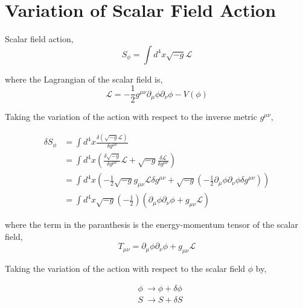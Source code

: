 \section{Variation of Scalar Field Action \label{sec:variation_of_sf_action}}

Scalar field action,
\begin{equation}
S_{\phi} = \int d^{4}x\sqrt{-g}\mathcal{L}
\end{equation}

where the Lagrangian of the scalar field is,
\begin{equation}
\mathcal{L} = -\frac{1}{2}g^{\mu\nu}\partial_{\mu}\phi\partial_{\nu}\phi - V\left(\phi\right)
\end{equation}

Taking the variation of the action with respect to the inverse metric $g^{\mu\nu}$,

\begin{equation}
\begin{split}
\delta S_{\phi} &= \int d^{4}x\frac{\delta\left(\sqrt{-g}\mathcal{L}\right)}{\delta g^{\mu\nu}}\\
&= \int d^{4}x\left(\frac{\delta\sqrt{-g}}{\delta g^{\mu\nu}}\mathcal{L} + \sqrt{-g}\frac{\delta\mathcal{L}}{\delta g^{\mu\nu}}\right)\\
&= \int d^{4}x\left(-\frac{1}{2}\sqrt{-g}g_{\mu\nu}\mathcal{L}\delta g^{\mu\nu} + \sqrt{-g}\left(-\frac{1}{2}\partial_{\mu}\phi\partial_{\nu}\phi\delta g^{\mu\nu}\right)\right)\\
&= \int d^{4}x\sqrt{-g}\left(-\frac{1}{2}\right)\left(\partial_{\mu}\phi\partial_{\nu}\phi + g_{\mu\nu}\mathcal{L}\right)
\end{split}
\end{equation}

where the term in the paranthesis is the energy-momentum tensor of the scalar field,
\begin{equation}
T_{\mu\nu} = \partial_{\mu}\phi\partial_{\nu}\phi + g_{\mu\nu}\mathcal{L}
\end{equation}


Taking the variation of the action with respect to the scalar field $\phi$ by,

\begin{equation}
\begin{split}
&\phi\ \rightarrow \phi + \delta\phi\\
&S\ \rightarrow S + \delta S
\end{split}
\end{equation}

